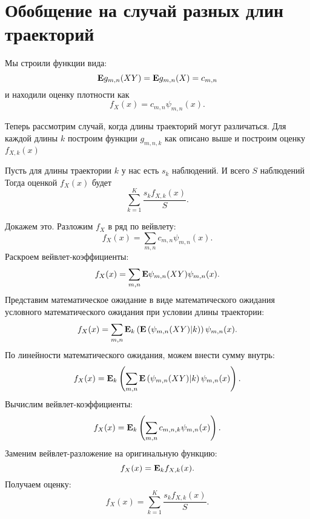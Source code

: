 \documentclass[../paper.tex]{subfiles}
\begin{document}
\section{Обобщение на случай разных длин траекторий}
Мы строили функции вида:
\[
  \mathbf{E} g_{m,n}(XY) = \mathbf{E} g_{m,n}(X) = c_{m,n}
\] и находили оценку плотности как
\[
  f_X(x) = c_{m,n} \psi_{m,n}(x)
.\]

Теперь рассмотрим случай, когда длины траекторий могут различаться.
Для каждой длины $k$ построим функции $g_{m,n,k}$ как описано выше
и построим оценку $f_{X,k}(x)$

Пусть для длины траектории $k$ у нас есть $s_k$ наблюдений. И всего $S$ наблюдений
Тогда оценкой $f_X(x)$ будет
\[
  \sum_{k=1}^K \frac{s_k f_{X,k}(x)}{S}
.\]

Докажем это. Разложим $f_X$ в ряд по вейвлету:
\[
  f_X(x) = \sum_{m,n} c_{m,n} \psi_{m,n}(x).
\]
Раскроем вейвлет-коэффициенты:
\[
  f_X(x) = \sum_{m,n} \mathbf{E} \psi_{m,n}(XY) \psi_{m,n}(x).
\]
Представим математическое ожидание в виде математического ожидания условного математического ожидания при условии длины траектории:
\[
  f_X(x) = \sum_{m,n} \mathbf{E}_k \left(\mathbf{E} \left(\psi_{m,n}(XY) | k \right) \right ) \psi_{m,n}(x).
\]
По линейности математического ожидания, можем внести сумму внутрь:
\[
  f_X(x) = \mathbf{E}_k \left( \sum_{m,n} \mathbf{E} \left(\psi_{m,n}(XY) | k \right) \psi_{m,n}(x) \right).
\]
Вычислим вейвлет-коэффициенты:
\[
  f_X(x) = \mathbf{E}_k \left(\sum_{m,n} c_{m,n,k} \psi_{m,n}(x) \right).
\]
Заменим вейвлет-разложение на оригинальную функцию:
\[
  f_X(x) = \mathbf{E}_k f_{X,k}(x).
\]
Получаем оценку:
\[
  f_X(x) = \sum_{k=1}^K \frac{s_k f_{X,k}(x)}{S}.
\]
\end{document}
